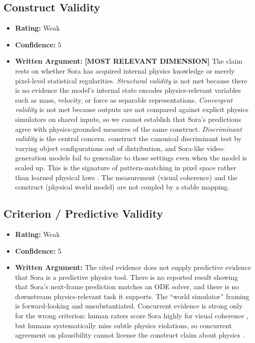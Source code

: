 \subsection{Construct Validity}
\begin{itemize}
    \item \textbf{Rating:} Weak
    \item \textbf{Confidence:} 5
    \item \textbf{Written Argument:} \textbf{[MOST RELEVANT DIMENSION]} The claim rests on whether Sora has acquired internal physics knowledge or merely pixel-level statistical regularities. \emph{Structural validity} is not met because there is no evidence the model's internal state encodes physics-relevant variables such as mass, velocity, or force as separable representations. \emph{Convergent validity} is not met because outputs are not compared against explicit physics simulators on shared inputs, so we cannot establish that Sora's predictions agree with physics-grounded measures of the same construct. \emph{Discriminant validity} is the central concern. \citet{kang2024video} construct the canonical discriminant test by varying object configurations out of distribution, and Sora-like video-generation models fail to generalize to those settings even when the model is scaled up. This is the signature of pattern-matching in pixel space rather than learned physical laws \citep{salaudeen2025measurement}. The measurement (visual coherence) and the construct (physical world model) are not coupled by a stable mapping.
\end{itemize}

\subsection{Criterion / Predictive Validity}
\begin{itemize}
    \item \textbf{Rating:} Weak
    \item \textbf{Confidence:} 5
    \item \textbf{Written Argument:} The cited evidence does not supply predictive evidence that Sora is a predictive physics tool. There is no reported result showing that Sora's next-frame prediction matches an ODE solver, and there is no downstream physics-relevant task it supports. The ``world simulator'' framing is forward-looking and unsubstantiated. Concurrent evidence is strong only for the wrong criterion: human raters score Sora highly for visual coherence \citep{openai2024sora}, but humans systematically miss subtle physics violations, so concurrent agreement on plausibility cannot license the construct claim about physics \citep{kang2024video,salaudeen2025measurement}.
\end{itemize}

